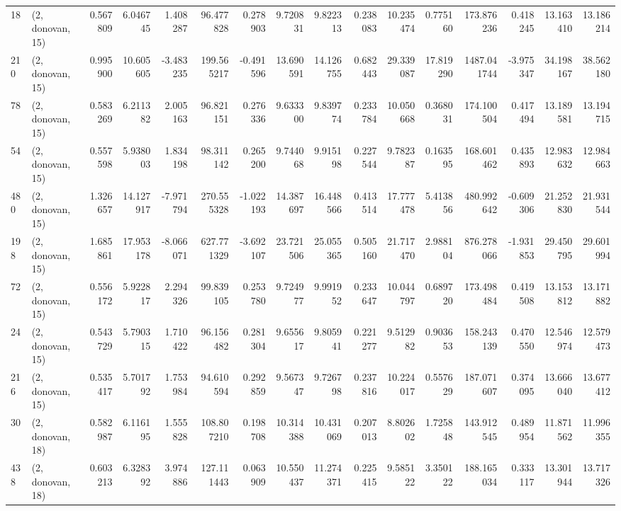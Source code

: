 \begin{tabular}{llrrrrrrrrrrrrrr}
18  &  (2, donovan, 15) &   0.567809 &   6.046745 &   1.408287 &    96.477828 &   0.278903 &   9.720831 &   9.822313 &  0.238083 &  10.235474 &   0.775160 &   173.876236 &   0.418245 &  13.163410 &  13.186214 \\
210 &  (2, donovan, 15) &   0.995900 &  10.605605 &  -3.483235 &   199.565217 &  -0.491596 &  13.690591 &  14.126755 &  0.682443 &  29.339087 &  17.819290 &  1487.041744 &  -3.975347 &  34.198167 &  38.562180 \\
78  &  (2, donovan, 15) &   0.583269 &   6.211382 &   2.005163 &    96.821151 &   0.276336 &   9.633300 &   9.839774 &  0.233784 &  10.050668 &   0.368031 &   174.100504 &   0.417494 &  13.189581 &  13.194715 \\
54  &  (2, donovan, 15) &   0.557598 &   5.938003 &   1.834198 &    98.311142 &   0.265200 &   9.744068 &   9.915198 &  0.227544 &   9.782387 &   0.163595 &   168.601462 &   0.435893 &  12.983632 &  12.984663 \\
480 &  (2, donovan, 15) &   1.326657 &  14.127917 &  -7.971794 &   270.555328 &  -1.022193 &  14.387697 &  16.448566 &  0.413514 &  17.777478 &   5.413856 &   480.992642 &  -0.609306 &  21.252830 &  21.931544 \\
198 &  (2, donovan, 15) &   1.685861 &  17.953178 &  -8.066071 &   627.771329 &  -3.692107 &  23.721506 &  25.055365 &  0.505160 &  21.717470 &   2.988104 &   876.278066 &  -1.931853 &  29.450795 &  29.601994 \\
72  &  (2, donovan, 15) &   0.556172 &   5.922817 &   2.294326 &    99.839105 &   0.253780 &   9.724977 &   9.991952 &  0.233647 &  10.044797 &   0.689720 &   173.498484 &   0.419508 &  13.153812 &  13.171882 \\
24  &  (2, donovan, 15) &   0.543729 &   5.790315 &   1.710422 &    96.156482 &   0.281304 &   9.655617 &   9.805941 &  0.221277 &   9.512982 &   0.903653 &   158.243139 &   0.470550 &  12.546974 &  12.579473 \\
216 &  (2, donovan, 15) &   0.535417 &   5.701792 &   1.753984 &    94.610594 &   0.292859 &   9.567347 &   9.726798 &  0.237816 &  10.224017 &   0.557629 &   187.071607 &   0.374095 &  13.666040 &  13.677412 \\
30  &  (2, donovan, 18) &   0.582987 &   6.116195 &   1.555828 &   108.807210 &   0.198708 &  10.314388 &  10.431069 &  0.207013 &   8.802602 &   1.725848 &   143.912545 &   0.489954 &  11.871562 &  11.996355 \\
438 &  (2, donovan, 18) &   0.603213 &   6.328392 &   3.974886 &   127.111443 &   0.063909 &  10.550437 &  11.274371 &  0.225415 &   9.585122 &   3.350122 &   188.165034 &   0.333117 &  13.301944 &  13.717326 \\

\end{tabular}

